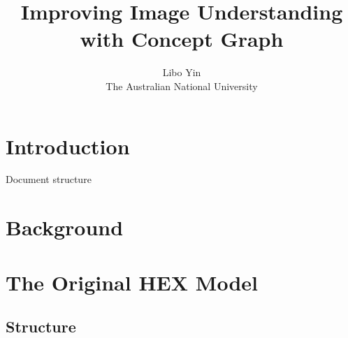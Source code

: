 \documentclass[11pt,a4paper]{article}
\begin{document}
\title{Improving Image Understanding with Concept Graph}
\author{Libo Yin\\The Australian National University}
\maketitle

\section{Introduction}

Document structure

\section{Background}

\section{The Original HEX Model}
\subsection{Structure}
\end{document}
